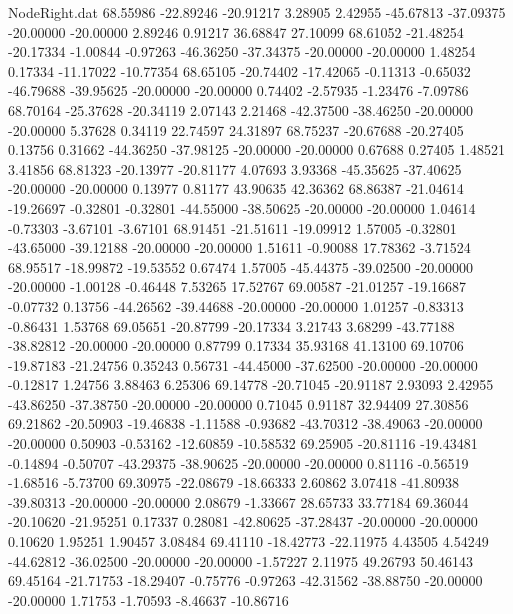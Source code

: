 \begin{filecontents}{NodeRight.dat}
  68.55986  -22.89246  -20.91217     3.28905    2.42955  -45.67813  -37.09375  -20.00000  -20.00000    2.89246    0.91217   36.68847   27.10099
  68.61052  -21.48254  -20.17334    -1.00844   -0.97263  -46.36250  -37.34375  -20.00000  -20.00000    1.48254    0.17334  -11.17022  -10.77354
  68.65105  -20.74402  -17.42065    -0.11313   -0.65032  -46.79688  -39.95625  -20.00000  -20.00000    0.74402   -2.57935   -1.23476   -7.09786
  68.70164  -25.37628  -20.34119     2.07143    2.21468  -42.37500  -38.46250  -20.00000  -20.00000    5.37628    0.34119   22.74597   24.31897
  68.75237  -20.67688  -20.27405     0.13756    0.31662  -44.36250  -37.98125  -20.00000  -20.00000    0.67688    0.27405    1.48521    3.41856
  68.81323  -20.13977  -20.81177     4.07693    3.93368  -45.35625  -37.40625  -20.00000  -20.00000    0.13977    0.81177   43.90635   42.36362
  68.86387  -21.04614  -19.26697    -0.32801   -0.32801  -44.55000  -38.50625  -20.00000  -20.00000    1.04614   -0.73303   -3.67101   -3.67101
  68.91451  -21.51611  -19.09912     1.57005   -0.32801  -43.65000  -39.12188  -20.00000  -20.00000    1.51611   -0.90088   17.78362   -3.71524
  68.95517  -18.99872  -19.53552     0.67474    1.57005  -45.44375  -39.02500  -20.00000  -20.00000   -1.00128   -0.46448    7.53265   17.52767
  69.00587  -21.01257  -19.16687    -0.07732    0.13756  -44.26562  -39.44688  -20.00000  -20.00000    1.01257   -0.83313   -0.86431    1.53768
  69.05651  -20.87799  -20.17334     3.21743    3.68299  -43.77188  -38.82812  -20.00000  -20.00000    0.87799    0.17334   35.93168   41.13100
  69.10706  -19.87183  -21.24756     0.35243    0.56731  -44.45000  -37.62500  -20.00000  -20.00000   -0.12817    1.24756    3.88463    6.25306
  69.14778  -20.71045  -20.91187     2.93093    2.42955  -43.86250  -37.38750  -20.00000  -20.00000    0.71045    0.91187   32.94409   27.30856
  69.21862  -20.50903  -19.46838    -1.11588   -0.93682  -43.70312  -38.49063  -20.00000  -20.00000    0.50903   -0.53162  -12.60859  -10.58532
  69.25905  -20.81116  -19.43481    -0.14894   -0.50707  -43.29375  -38.90625  -20.00000  -20.00000    0.81116   -0.56519   -1.68516   -5.73700
  69.30975  -22.08679  -18.66333     2.60862    3.07418  -41.80938  -39.80313  -20.00000  -20.00000    2.08679   -1.33667   28.65733   33.77184
  69.36044  -20.10620  -21.95251     0.17337    0.28081  -42.80625  -37.28437  -20.00000  -20.00000    0.10620    1.95251    1.90457    3.08484
  69.41110  -18.42773  -22.11975     4.43505    4.54249  -44.62812  -36.02500  -20.00000  -20.00000   -1.57227    2.11975   49.26793   50.46143
  69.45164  -21.71753  -18.29407    -0.75776   -0.97263  -42.31562  -38.88750  -20.00000  -20.00000    1.71753   -1.70593   -8.46637  -10.86716

\end{filecontents}

